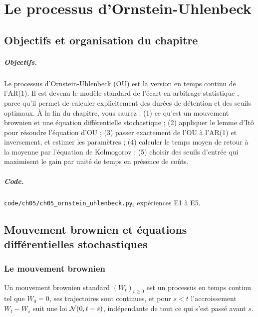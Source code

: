 \chapter{Le processus d'Ornstein-Uhlenbeck}
\label{ch:5}

\section{Objectifs et organisation du chapitre}

\paragraph{Objectifs.} Le processus d'Ornstein-Uhlenbeck (OU) est la version en temps continu de l'AR(1). Il est devenu le modèle standard de l'écart en arbitrage statistique \citep{avellaneda2010,bertram2010,leungli2016}, parce qu'il permet de calculer explicitement des durées de détention et des seuils optimaux. À la fin du chapitre, vous saurez : (1) ce qu'est un mouvement brownien et une équation différentielle stochastique ; (2) appliquer le lemme d'Itô pour résoudre l'équation d'OU ; (3) passer exactement de l'OU à l'AR(1) et inversement, et estimer les paramètres ; (4) calculer le temps moyen de retour à la moyenne par l'équation de Kolmogorov ; (5) choisir des seuils d'entrée qui maximisent le gain par unité de temps en présence de coûts.

\paragraph{Code.} \texttt{code/ch05/ch05\_ornstein\_uhlenbeck.py}, expériences E1 à E5.

\section{Mouvement brownien et équations différentielles stochastiques}

\subsection{Le mouvement brownien}

\begin{definition}
Un mouvement brownien standard $(W_t)_{t\ge0}$ est un processus en temps continu tel que $W_0 = 0$, ses trajectoires sont continues, et pour $s<t$ l'accroissement $W_t - W_s$ suit une loi $\mathcal{N}(0, t-s)$, indépendante de tout ce qui s'est passé avant $s$.
\end{definition}

